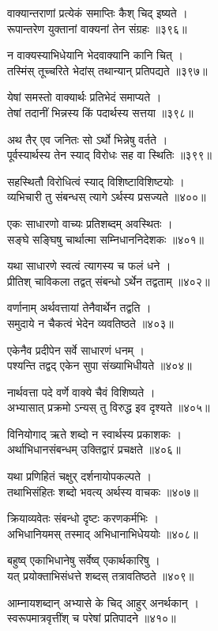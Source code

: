 वाक्यान्तराणां प्रत्येकं समाप्तिः कैश् चिद् इष्यते ।\\रूपान्तरेण युक्तानां वाक्यनां तेन संग्रहः ॥३९६॥

न वाक्यस्याभिधेयानि भेदवाक्यानि कानि चित् ।\\तस्मिंस् तूच्चरिते भेदांस् तथान्यान् प्रतिपद्यते ॥३९७॥

येषां समस्तो वाक्यार्थः प्रतिभेदं समाप्यते ।\\तेषां तदानीं भिन्नस्य किं पदार्थस्य सत्तया ॥३९८॥

अथ तैर् एव जनितः सो ऽर्थो भिन्नेषु वर्तते ।\\पूर्वस्यार्थस्य तेन स्याद् विरोधः सह वा स्थितिः ॥३९९॥

सहस्थितौ विरोधित्वं स्याद् विशिष्टाविशिष्टयोः ।\\व्यभिचारी तु संबन्धस् त्यागे ऽर्थस्य प्रसज्यते ॥४००॥

एकः साधारणो वाच्यः प्रतिशब्दम् अवस्थितः ।\\सङ्घे सङ्घिषु चार्थात्मा सम्निधाननिदेशकः ॥४०१॥

यथा साधारणे स्वत्वं त्यागस्य च फलं धने ।\\प्रीतिश् चाविकला तद्वत् संबन्धो ऽर्थेन तद्वताम् ॥४०२॥

वर्णानाम् अर्थवत्तायां तेनैवार्थेन तद्वति ।\\समुदाये न चैकत्वं भेदेन व्यवतिष्ठते ॥४०३॥

एकेनैव प्रदीपेन सर्वे साधारणं धनम् ।\\पश्यन्ति तद्वद् एकेन सुपा संख्याभिधीयते ॥४०४॥

नार्थवत्ता पदे वर्णे वाक्ये चैवं विशिष्यते ।\\अभ्यासात् प्रक्रमो ऽन्यस् तु विरुद्ध इव दृश्यते ॥४०५॥

विनियोगाद् ऋते शब्दो न स्वार्थस्य प्रकाशकः ।\\अर्थाभिधानसंबन्धम् उक्तिद्वारं प्रचक्षते ॥४०६॥

यथा प्रणिहितं चक्षुर् दर्शनायोपकल्पते ।\\तथाभिसंहितः शब्दो भवत्य् अर्थस्य वाचकः ॥४०७॥

क्रियाव्यवेतः संबन्धो दृष्टः करणकर्मभिः ।\\अभिधानियमस् तस्माद् अभिधानाभिधेययोः ॥४०८॥

बहुष्व् एकाभिधानेषु सर्वेष्व् एकार्थकारिषु ।\\यत् प्रयोक्ताभिसंधत्ते शब्दस् तत्रावतिष्ठते ॥४०९॥

आम्नायशब्दान् अभ्यासे के चिद् आहुर् अनर्थकान् ।\\स्वरूपमात्रवृत्तींश् च परेषां प्रतिपादने ॥४१०॥

